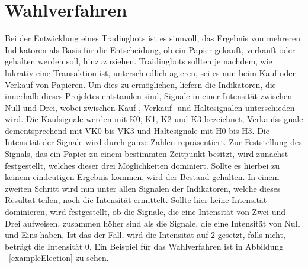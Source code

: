 

\section{Wahlverfahren}

Bei der Entwicklung eines Tradingbots ist es sinnvoll, das Ergebnis von mehreren Indikatoren als Basis für die Entscheidung, ob ein Papier gekauft, verkauft oder gehalten werden soll, hinzuzuziehen. Traidingbots sollten je nachdem, wie lukrativ eine Transaktion ist, unterschiedlich agieren, sei es nun beim Kauf oder Verkauf von Papieren. Um dies zu ermöglichen, liefern die Indikatoren, die innerhalb dieses Projektes entstanden sind, Signale in einer Intensität zwischen Null und Drei, wobei zwischen Kauf-, Verkauf- und Haltesignalen unterschieden wird. Die Kaufsignale werden mit K0, K1, K2 und K3 bezeichnet, Verkaufssignale dementsprechend mit VK0 bis VK3 und Haltesignale mit H0 bis H3. Die Intensität der Signale wird durch ganze Zahlen repräsentiert. Zur Feststellung des Signals, das ein Papier zu einem bestimmten Zeitpunkt besitzt, wird zunächst festgestellt, welches dieser drei Möglichkeiten dominiert. Sollte es hierbei zu keinem eindeutigen Ergebnis kommen, wird der Bestand gehalten. In einem zweiten 
Schritt wird nun unter allen Signalen der Indikatoren, welche dieses Resultat teilen, noch die Intensität ermittelt. Sollte hier keine Intensität dominieren, wird festgestellt, ob die Signale, die eine Intensität von Zwei und Drei aufweisen, zusammen höher sind als die Signale, die eine Intensität von Null und Eins haben. Ist das der Fall, wird die Intensität auf 2 gesetzt, falls nicht, beträgt die Intensität 0. Ein Beispiel für das Wahlverfahren ist in Abbildung ~\ref{exampleElection} zu sehen.

